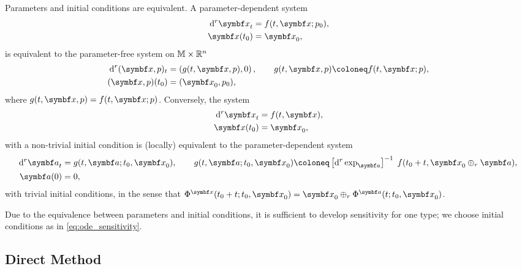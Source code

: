 \begin{remark}
  Parameters and initial conditions are equivalent. A parameter-dependent system
  \begin{equation}
    \begin{aligned}
      \mathrm{d}^r \x_t & = f(t, \x; p_{0}), \\
      \x(t_{0})         & = \x_{0},
    \end{aligned}
  \end{equation}
  is equivalent to the parameter-free system on $\mathbb{M} \times \mathbb{R}^{n}$
  \begin{equation}
    \begin{aligned}
      \mathrm{d}^r (\x, p)_t & =  \left(g(t, \x, p), 0\right), \qquad g(t, \x, p) \coloneq f(t, \x; p), \\
      (\x, p)(t_{0})         & = (\x_0, p_{0}),
    \end{aligned}
  \end{equation}
  where $g(t, \x, p) = f(t, \x; p)$. Conversely, the system
  \begin{equation}
    \begin{aligned}
      \mathrm{d}^{r} \x_{t} & = f(t, \x), \\
      \x(t_{0})             & = \x_{0},
    \end{aligned}
  \end{equation}
  with a non-trivial initial condition is (locally) equivalent to the parameter-dependent system
  \begin{equation}
    \begin{aligned}
      \mathrm{d}^{r} \a_{t} & = g(t, \a; t_{0}, \x_{0}), \qquad g(t, \a; t_{0}, \x_{0}) \coloneq \left[ \mathrm{d}^{r} \exp_{\a} \right]^{-1} \; f(t_{0} + t, \x_{0} \oplus_{r} \a), \\
      \a(0)                 & = 0,
    \end{aligned}
  \end{equation}
  with trivial initial conditions, in the sense that $\Phi^{\x}(t_{0} + t; t_{0}, \x_{0}) = \x_{0} \oplus_{r} \Phi^{\a}(t; t_{0}, \x_{0})$.
\end{remark}
Due to the equivalence between parameters and initial conditions, it is sufficient to develop sensitivity for one type; we choose initial conditions as in \eqref{eq:ode_sensitivity}.

\subsection{Direct Method}

